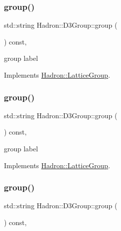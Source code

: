 \subsubsection{\texorpdfstring{group()}{group()}\hspace{0.1cm}{\footnotesize\ttfamily [1/3]}}
{\footnotesize\ttfamily std\+::string Hadron\+::\+D3\+Group\+::group (\begin{DoxyParamCaption}{ }\end{DoxyParamCaption}) const\hspace{0.3cm}{\ttfamily [inline]}, {\ttfamily [virtual]}}

group label 

Implements \mbox{\hyperlink{structHadron_1_1LatticeGroup_a82208a322bf1b1db489f16af38e70087}{Hadron\+::\+Lattice\+Group}}.

\mbox{\label{structHadron_1_1D3Group_a60e24b1e2d17481b7ab94860c95ce155}} 
\subsubsection{\texorpdfstring{group()}{group()}\hspace{0.1cm}{\footnotesize\ttfamily [2/3]}}
{\footnotesize\ttfamily std\+::string Hadron\+::\+D3\+Group\+::group (\begin{DoxyParamCaption}{ }\end{DoxyParamCaption}) const\hspace{0.3cm}{\ttfamily [inline]}, {\ttfamily [virtual]}}

group label 

Implements \mbox{\hyperlink{structHadron_1_1LatticeGroup_a82208a322bf1b1db489f16af38e70087}{Hadron\+::\+Lattice\+Group}}.

\mbox{\label{structHadron_1_1D3Group_a60e24b1e2d17481b7ab94860c95ce155}} 
\subsubsection{\texorpdfstring{group()}{group()}\hspace{0.1cm}{\footnotesize\ttfamily [3/3]}}
{\footnotesize\ttfamily std\+::string Hadron\+::\+D3\+Group\+::group (\begin{DoxyParamCaption}{ }\end{DoxyParamCaption}) const\hspace{0.3cm}{\ttfamily [inline]}, {\ttfamily [virtual]}}

